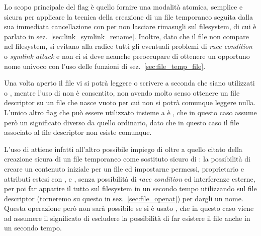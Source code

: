 Lo scopo principale del flag è quello fornire una modalità atomica, semplice e
sicura per applicare la tecnica della creazione di un file temporaneo seguita
dalla sua immediata cancellazione con  per non lasciare rimasugli
sul filesystem, di cui è parlato in sez.~\ref{sec:link_symlink_rename}.
Inoltre, dato che il file non compare nel filesystem, si evitano alla radice
tutti gli eventuali problemi di \textit{race condition} o \textit{symlink
  attack} e non ci si deve neanche preoccupare di ottenere un opportuno nome
univoco con l'uso delle funzioni di sez.~\ref{sec:file_temp_file}.

Una volta aperto il file vi si potrà leggere o scrivere a seconda che siano
utilizzati  o , mentre l'uso di
 non è consentito, non avendo molto senso ottenere un file
descriptor su un file che nasce vuoto per cui non si potrà comunque leggere
nulla. L'unico altro flag che può essere utilizzato insieme a
 è , che in questo caso assume però un
significato diverso da quello ordinario, dato che in questo caso il file
associato al file descriptor non esiste comunque.

L'uso di  attiene infatti all'altro possibile impiego di
 oltre a quello citato della creazione sicura di un file
temporaneo come sostituto sicuro di : la possibilità di creare
un contenuto iniziale per un file ed impostarne permessi, proprietario e
attributi estesi con ,  e , senza
possibilità di \textit{race condition} ed interferenze esterne, per poi far
apparire il tutto sul filesystem in un secondo tempo utilizzando 
sul file descriptor (torneremo su questo in sez.~\ref{sec:file_openat}) per
dargli un nome. Questa operazione però non sarà possibile se si è usato
, che in questo caso viene ad assumere il significato di
escludere la possibilità di far esistere il file anche in un secondo tempo.



